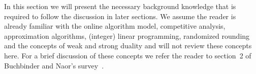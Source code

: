 In this section we will present the necessary background knowledge that is required to follow the discussion in later sections. We assume the reader is already familiar with the online algorithm model, competitive analysis, approximation algorithms, (integer) linear programming, randomized rounding and the concepts of weak and strong duality and will not review these concepts here. For a brief discussion of these concepts we refer the reader to section~2 of Buchbinder and Naor's survey~\cite{buchbinder09:survey}.